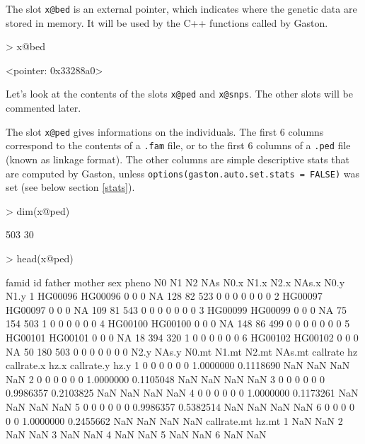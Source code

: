 \documentclass{article}
\renewenvironment{Schunk}{\vspace{\topsep}}{\vspace{\topsep}}
\begin{document}
  The slot \verb!x@bed! is an external pointer, which indicates where the genetic data are stored in
  memory. It will be used by the C++ functions called by Gaston. 
\begin{Schunk}
\begin{Sinput}
> x@bed
\end{Sinput}
\begin{Soutput}
<pointer: 0x33288a0>
\end{Soutput}
\end{Schunk}

  Let's look at the contents of the slots \verb!x@ped! and \verb!x@snps!.
  The other slots will be commented later.

  The slot \verb!x@ped! gives informations on the individuals. 
  The first 6 columns correspond to the contents of a \verb!.fam! file, or to the first 6 columns of a \verb!.ped! file 
  (known as linkage format). The other columns are simple descriptive
  stats that are computed by Gaston, unless \verb!options(gaston.auto.set.stats = FALSE)!
  was set (see below section \ref{stats}).

\begin{Schunk}
\begin{Sinput}
> dim(x@ped)
\end{Sinput}
\begin{Soutput}
[1] 503  30
\end{Soutput}
\begin{Sinput}
> head(x@ped)
\end{Sinput}
\begin{Soutput}
    famid      id father mother sex pheno  N0  N1  N2 NAs N0.x N1.x N2.x NAs.x N0.y N1.y
1 HG00096 HG00096      0      0   0    NA 128  82 523   0    0    0    0     0    0    0
2 HG00097 HG00097      0      0   0    NA 109  81 543   0    0    0    0     0    0    0
3 HG00099 HG00099      0      0   0    NA  75 154 503   1    0    0    0     0    0    0
4 HG00100 HG00100      0      0   0    NA 148  86 499   0    0    0    0     0    0    0
5 HG00101 HG00101      0      0   0    NA  18 394 320   1    0    0    0     0    0    0
6 HG00102 HG00102      0      0   0    NA  50 180 503   0    0    0    0     0    0    0
  N2.y NAs.y N0.mt N1.mt N2.mt NAs.mt  callrate        hz callrate.x hz.x callrate.y hz.y
1    0     0     0     0     0      0 1.0000000 0.1118690        NaN  NaN        NaN  NaN
2    0     0     0     0     0      0 1.0000000 0.1105048        NaN  NaN        NaN  NaN
3    0     0     0     0     0      0 0.9986357 0.2103825        NaN  NaN        NaN  NaN
4    0     0     0     0     0      0 1.0000000 0.1173261        NaN  NaN        NaN  NaN
5    0     0     0     0     0      0 0.9986357 0.5382514        NaN  NaN        NaN  NaN
6    0     0     0     0     0      0 1.0000000 0.2455662        NaN  NaN        NaN  NaN
  callrate.mt hz.mt
1         NaN   NaN
2         NaN   NaN
3         NaN   NaN
4         NaN   NaN
5         NaN   NaN
6         NaN   NaN
\end{Soutput}
\end{Schunk}
\end{document}
